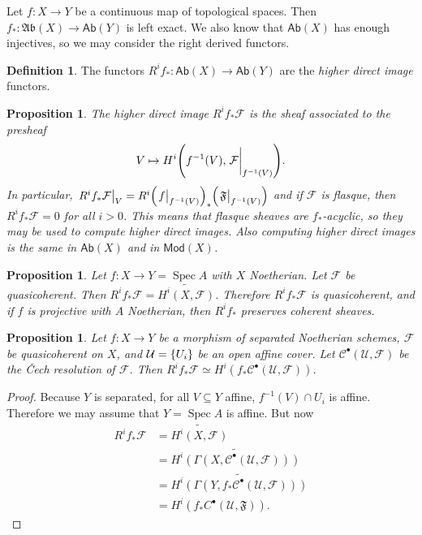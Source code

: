 \documentclass[leqno, openany]{memoir}
\newtheorem{prop}[thm]{Proposition}
\theoremstyle{definition}
\newtheorem{defn}[thm]{Definition}
\theoremstyle{remark}
\theoremstyle{plain}
\theoremstyle{definition}
\theoremstyle{remark}
\newcommand{\mc}[1]{\mathcal{#1}}
\newcommand{\mf}[1]{\mathfrak{#1}}
\newcommand{\ms}[1]{\mathsf{#1}}
\newcommand{\wt}[1]{\widetilde{#1}}
\DeclareMathOperator{\Spec}{Spec}
\begin{document}
Let $f \colon X \to Y$ be a continuous map of topological spaces. Then $f_* \colon \mf{Ab}(X) \to \ms{Ab}(Y)$ is left exact. We also know that $\ms{Ab}(X)$ has enough injectives, so we may consider the right derived functors.

\begin{defn}
    The functors $R^i f_* \colon \ms{Ab}(X) \to \ms{Ab}(Y)$ are the \textit{higher direct image} functors. 
\end{defn}

\begin{prop}
    The higher direct image $R^i f_* \mc{F}$ is the sheaf associated to the presheaf
    \[ V \mapsto H^i\qty(f^{-1}(V), \eval{\mc{F}}_{f^{-1}(V)}). \]
    In particular, $\eval{R^i f_* \mc{F}}_V = R^i {\qty(\eval{f}_{f^{-1}(V)})}_* \qty(\eval{\mf{F}}_{f^{-1}(V)})$ and if $\mc{F}$ is flasque, then $R^i f_* \mc{F} = 0$ for all $i > 0$. This means that flasque sheaves are $f_*$-acyclic, so they may be used to compute higher direct images. Also computing higher direct images is the same in $\ms{Ab}(X)$ and in $\ms{Mod}(X)$.
\end{prop}

\begin{prop}
    Let $f \colon X \to Y = \Spec A$ with $X$ Noetherian. Let $\mc{F}$ be quasicoherent. Then $R^i f_* \mc{F} = \wt{H^i(X, \mc{F})}$. Therefore $R^i f_* \mc{F}$ is quasicoherent, and if $f$ is projective with $A$ Noetherian, then $R^i f_*$ preserves coherent sheaves.
\end{prop}

\begin{prop}
    Let $f \colon X \to Y$ be a morphism of separated Noetherian schemes, $\mc{F}$ be quasicoherent on $X$, and $\mc{U} = \qty{U_i}$ be an open affine cover. Let $\mc{C}^{\bullet}(\mc{U}, \mc{F})$ be the \v{C}ech resolution of $\mc{F}$. Then $R^i f_* \mc{F} \simeq H^i(f_* \mc{C}^{\bullet}(\mc{U}, \mc{F}))$.
\end{prop}

\begin{proof}
    Because $Y$ is separated, for all $V \subseteq Y$ affine, $f^{-1}(V) \cap U_i$ is affine. Therefore we may assume that $Y = \Spec A$ is affine. But now 
    \begin{align*}
        R^i f_* \mc{F} &= \wt{H^i(X, \mc{F})} \\
                       &= \wt{H^i(\Gamma(X, \mc{C}^{\bullet}(\mc{U}, \mc{F})))} \\
                       &= \wt{H^i(\Gamma(Y, f_* \mc{C}^{\bullet}(\mc{U}, \mc{F})))} \\
                       &= H^i(f_* C^{\bullet}(\mc{U}, \mf{F})).
    \end{align*}
\end{proof}
\end{document}
